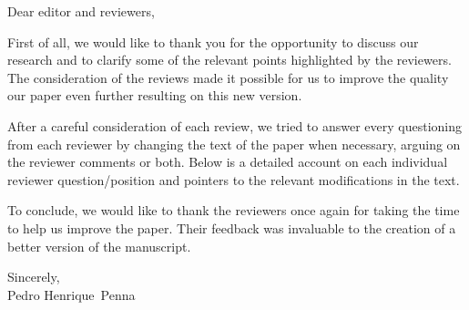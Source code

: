 \documentclass{letter}
\def\firstname{Pedro Henrique\xspace}
\def\lastname{Penna\xspace}
\begin{document}

\begin{letter}{}


\colorbox{myBlue}{
	\parbox[t]{\textwidth}{
		\vspace*{1em}
		\color{white}{\huge~Response to Reviews}
		\vspace*{1em}
	}
}


\fontsize{10pt}{12pt}\selectfont

\opening{Dear editor and reviewers,}

First of all, we would like to thank you for the opportunity to
discuss our research and to clarify some of the relevant points
highlighted by the reviewers. The consideration of the reviews made it
possible for us to improve the quality our paper even further
resulting on this new version.

After a careful consideration of each review, we tried to answer every
questioning from each reviewer by changing the text of the paper when
necessary, arguing on the reviewer comments or both.  Below is a
detailed account on each individual reviewer question/position and
pointers to the relevant modifications in the text.

\begin{quotation}

\noindent\hrulefill



\end{quotation}



To conclude, we would like to thank the reviewers once again for taking the
time to help us improve the paper. Their feedback was invaluable to the
creation of a better version of the manuscript.

\vspace{2em}
Sincerely,\\[1em]
\firstname~\lastname

\end{letter}
\end{document}

